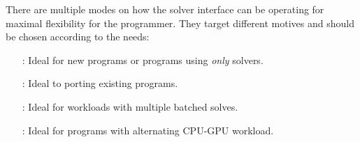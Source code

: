 
There are multiple modes on how the solver interface can be operating for maximal flexibility for the programmer.
They target different motives and should be chosen according to the needs:
\begin{itemize}[leftmargin=77pt]
  \item[\Cref{sec:develop:sync:way}:]    Ideal for new programs or programs using \emph{only} \quda solvers.
  \item[\Cref{sec:develop:openqcd:way}:] Ideal to porting existing programs.
  \item[\Cref{sec:develop:mrhs:way}:]    Ideal for workloads with multiple batched solves.
  \item[\Cref{sec:develop:async:way}:]   Ideal for programs with alternating CPU-GPU workload.
\end{itemize}


